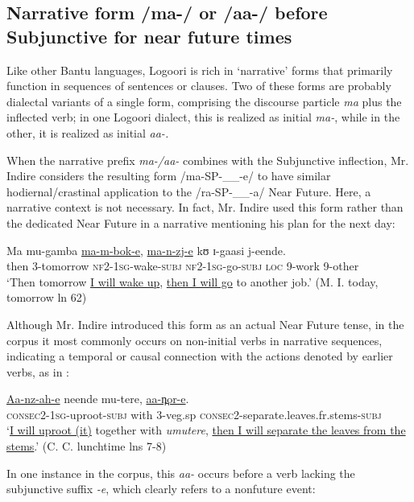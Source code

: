 \documentclass[output=paper]{langsci/langscibook}
\begin{document}
\subsection{Narrative form /ma-/ or /aa-/ before Subjunctive for near future times} \label{sec:sarvasy:7.4}

Like other Bantu languages, Logoori is rich in ‘narrative’ %
%
forms that primarily function in sequences of sentences or clauses. Two of these forms are probably dialectal variants of a single form, comprising the discourse particle \textit{ma }plus the inflected verb; in one Logoori dialect, this is realized as initial \textit{ma-}, while in the other, it is realized as initial \textit{aa-. }

When the narrative prefix \textit{ma-/aa-} combines with the Subjunctive inflection, Mr. Indire considers the resulting form /ma-SP-\_\_-e/ to have similar hodiernal/crastinal application to the /ra-SP-\_\_-a/ Near Future. Here, a narrative context is not necessary. In fact, Mr. Indire used this form rather than the dedicated Near Future in a narrative mentioning his plan for the next day:

\ea\label{ex:sarvasy:28}
\gll Ma   mu-gamba   \underline{ma-m-bok-e},     \underline{ma-n-zj-e}     kʊ   ɪ{}-gaasi   j-eende. \\
then   3-tomorrow   \textsc{nf2}{}-\textsc{1sg}{}-wake-\textsc{subj}  \textsc{nf2}{}-\textsc{1sg}{}-go-\textsc{subj}  \textsc{loc}  9-work  9-other \\
\glt ‘Then tomorrow \underline{I will wake up}, \underline{then I will go} to another job.’ (M. I. today, tomorrow ln 62)
\z

Although Mr. Indire introduced this form as an actual Near Future tense, in the corpus it most commonly occurs on non-initial verbs in narrative sequences, indicating a temporal or causal connection with the actions denoted by earlier verbs, as in : 

\ea\label{ex:sarvasy:29}
\gll \underline{Aa-nz-ah-e}       neende   mu-tere,  \underline{aa-n̪or-e}.\\
\textsc{consec2}{}-\textsc{1sg}{}-uproot-\textsc{subj}  with  3-veg.sp  \textsc{consec2}{}-separate.leaves.fr.stems-\textsc{subj} \\
\glt ‘\underline{I will uproot (it)} together with \textit{umutere}, \underline{then I will separate the leaves from the stems}.’ (C. C. lunchtime lns 7-8)
\z

In one instance in the corpus, this\textit{ aa-} occurs before a verb lacking the subjunctive suffix \textit{{}-e}, which clearly refers to a nonfuture event:
\end{document}

